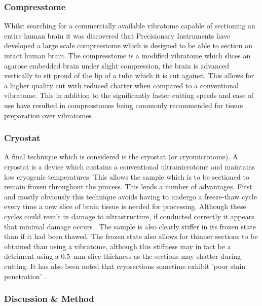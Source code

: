\documentclass[a4paper, 11pt]{article}
\numberwithin{equation}{section}
\begin{document}
	\subsubsection{Compresstome}
	\label{sectioning_small_compresstome}
	
	Whilst searching for a commercially available vibratome capable of sectioning an entire human brain it was discovered that Precisionary Instruments have developed a large scale compresstome which is designed to be able to section an intact human brain. The compresstome is a modified vibratome which slices an agarose embedded brain under slight compression, the brain is advanced vertically to sit proud of the lip of a tube which it is cut against. This allows for a higher quality cut with reduced chatter when compared to a conventional vibratome. This in addition to the significantly faster cutting speeds and ease of use have resulted in compresstomes being commonly recommended for tissue preparation over vibratomes \cite{abdelaal2015comparison}.
	
	\subsubsection{Cryostat}
	\label{sectioning_small_cryostat}
	
	A final technique which is considered is the cryostat (or cryomicrotome). A cryostat is a device which contains a conventional ultramicrotome and maintains low cryogenic temperatures. This allows the sample which is to be sectioned to remain frozen throughout the process. This lends a number of advantages. First and mostly obviously this technique avoids having to undergo a freeze-thaw cycle every time a new slice of brain tissue is needed for processing. Although these cycles could result in damage to ultrastructure, if conducted correctly it appears that minimal damage occurs \cite{Aldehyde_stabilized_cryopreservation}. The sample is also clearly stiffer in its frozen state than if it had been thawed. The frozen state also allows for thinner sections to be obtained than using a vibratome, although this stiffness may in fact be a detriment using a \SI{0.5}{\milli\meter} slice thickness as the sections may shatter during cutting. It has also been noted that cryosections sometime exhibit 'poor stain penetration' \cite{dorph2001tissue}.
	
	\subsubsection{Discussion \& Method}
	\label{sectioning_small_discussion}
	
\end{document}
